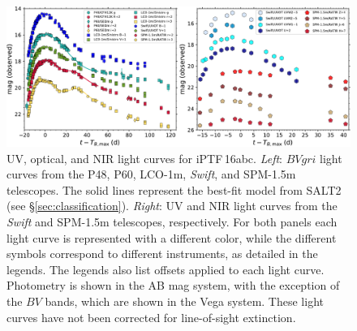 \documentclass[twocolumn]{aastex61}
\newcommand{\abc}{iPTF\,16abc}
\begin{document}
\begin{figure}[ht]
  \centering
  \includegraphics[width=7in]{lightcurve2.pdf}
  \caption{
  UV, optical, and NIR light curves for \abc. \textit{Left}: $BVgri$ light
  curves from the P48, P60, LCO-1m, \textit{Swift}, and SPM-1.5m telescopes.
  The solid lines represent the best-fit model from SALT2 (see
  \S\ref{sec:classification}). \textit{Right}: UV and NIR light curves from
  the \textit{Swift} and SPM-1.5m telescopes, respectively. For both panels
  each light curve is represented with a different color, while the different
  symbols correspond to different instruments, as detailed in the legends. The
  legends also list offsets applied to each light curve. Photometry is shown
  in the AB mag system, with the exception of the $BV$ bands, which are shown
  in the Vega system. These light curves have not been corrected for
  line-of-sight extinction.}
  \label{fig:ugly_LC}
\end{figure}



\end{document}
